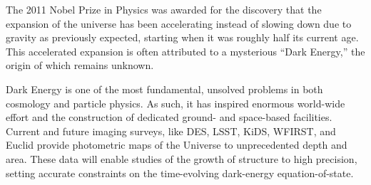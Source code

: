 \documentclass[oneside,11pt]{amsart}
\begin{document}

The 2011 Nobel Prize in Physics was awarded for the discovery that the
expansion of the universe has been accelerating instead of slowing down
due to gravity as previously expected, starting when it was roughly half
its current age.  This accelerated expansion is often attributed to a
mysterious ``Dark Energy,'' the origin of which remains unknown.

Dark Energy is one of the most fundamental, unsolved problems in both
cosmology and particle physics.  As such, it has inspired enormous
world-wide effort and the construction of dedicated ground- and
space-based facilities.  Current and future imaging surveys, like DES,
LSST, KiDS, WFIRST, and Euclid 
provide photometric maps of the Universe to
unprecedented depth and area.  These data will enable studies of the
growth of structure to high precision, setting accurate constraints on the
time-evolving dark-energy equation-of-state. 

\end{document}
